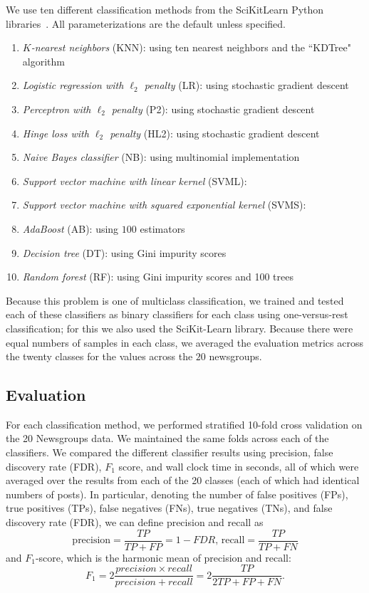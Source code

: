 \documentclass{article} %
\begin{document}
We use ten different classification methods from the SciKitLearn Python libraries~\cite{scikit-learn}. All parameterizations are the default unless specified.
\begin{enumerate}
\item \emph{$K$-nearest neighbors} (KNN): using ten nearest neighbors and the ``KDTree" algorithm
\item \emph{Logistic regression with $\ell_2$ penalty} (LR): using stochastic gradient descent 
\item \emph{Perceptron with $\ell_2$ penalty} (P2): using stochastic gradient descent
\item \emph{Hinge loss with $\ell_2$ penalty} (HL2): using stochastic gradient descent
\item \emph{Naive Bayes classifier} (NB): using multinomial implementation
\item \emph{Support vector machine with linear kernel} (SVML): 
\item \emph{Support vector machine with squared exponential kernel} (SVMS): 
\item \emph{AdaBoost} (AB): using $100$ estimators
\item \emph{Decision tree} (DT): using Gini impurity scores 
\item \emph{Random forest} (RF): using Gini impurity scores and 100 trees
\end{enumerate}

Because this problem is one of multiclass classification, we trained and tested each of these classifiers as binary classifiers for each class using one-versus-rest classification; for this we also used the SciKit-Learn library. Because there were equal numbers of samples in each class, we averaged the evaluation metrics across the twenty classes for the values across the $20$ newsgroups.

\subsection{Evaluation}

For each classification method, we performed stratified 10-fold cross validation on the 20 Newsgroups data. We maintained the same folds across each of the classifiers. We compared the different classifier results using precision, false discovery rate (FDR), $F_1$ score, and wall clock time in seconds, all of which were averaged over the results from each of the 20 classes (each of which had identical numbers of posts). In particular, denoting the number of false positives (FPs), true positives (TPs), false negatives (FNs), true negatives (TNs), and false discovery rate (FDR), we can define precision and recall as
\begin{equation*}
\mbox{precision} = \frac {TP}{TP+FP} = 1 - FDR \mbox{,  recall} = \frac {TP}{TP+FN}
\end{equation*}
and $F_1$-score, which is the harmonic mean of precision and recall:
\begin{equation*}
F_1 = 2 \frac {precision \times recall} {precision + recall} = 2 \frac{TP}{2TP+FP+FN}.
\end{equation*}
\end{document}
